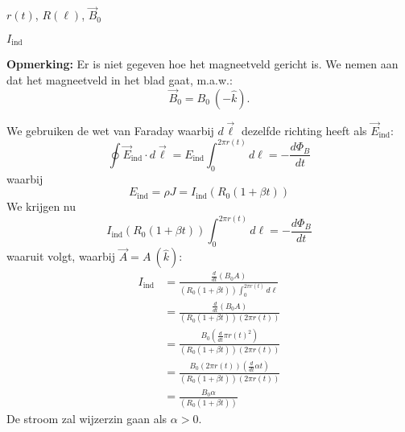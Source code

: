 \begin{description}[labelwidth=1.5cm, leftmargin=!]
    \item[Geg. :]  $r(t)$, $R(\ell)$, $\Vec{B}_0$
    \item[Gevr. :]  $I_{\text{ind}}$
    \item[Opl. :] 
        \textbf{Opmerking:} Er is niet gegeven hoe het magneetveld gericht is. We nemen aan dat het magneetveld in het blad gaat, m\@.a\@.w\@.:
        \begin{equation*}
            \Vec{B}_0 = B_0 \ (-\hat{k}).
        \end{equation*}

        \noindent We gebruiken de wet van Faraday waarbij $d\vec{\ell}$ dezelfde richting heeft als $\vec{E}_{\text{ind}}$:
        \begin{equation*}
            \oint \Vec{E}_{\text{ind}} \cdot d\vec{\ell} = E_{\text{ind}}\int_0^{2\pi r(t)}d\ell= - \frac{d\Phi_B}{dt} 
        \end{equation*}
        waarbij
        \begin{equation*}
            E_{\text{ind}} 
                = \rho J 
                = I_{\text{ind}}\left(R_{0}(1 + \beta t)\right)
        \end{equation*} 
        We krijgen nu
        \begin{equation*}
                I_{\text{ind}}\left(R_{0}(1 + \beta t)\right) \int_0^{2\pi r(t)} d\ell = - \frac{d\Phi_B}{dt}
        \end{equation*}
        waaruit volgt, waarbij $\vec{A} = A \ (\hat{k})$:
        \begin{align*}
            I_{\text{ind}} 
                &= \frac{\frac{d}{dt} \left( B_0 A \right)}{\left(R_{0}(1 + \beta t)\right) \int_0^{2\pi r(t)} d\ell } \\
                &= \frac{\frac{d}{dt} \left( B_0 A \right)}{\left(R_{0}(1 + \beta t)\right) \left(2\pi r(t)\right) } \\
                &= \frac{B_0 \left(\frac{d}{dt} \pi r(t)^2\right)}{\left(R_{0}(1 + \beta t)\right)\left(2\pi r(t)\right)} \\
                &= \frac{B_0 \left(2\pi r(t)\right) \left(\frac{d}{dt} \alpha t\right)}{\left(R_{0}(1 + \beta t)\right)\left(2\pi r(t)\right)} \\
                &= \frac{B_0 \alpha}{\left(R_{0}(1 + \beta t)\right)}
        \end{align*}
        De stroom zal wijzerzin gaan als $\alpha > 0$.
\end{description}

\vspace{1cm}